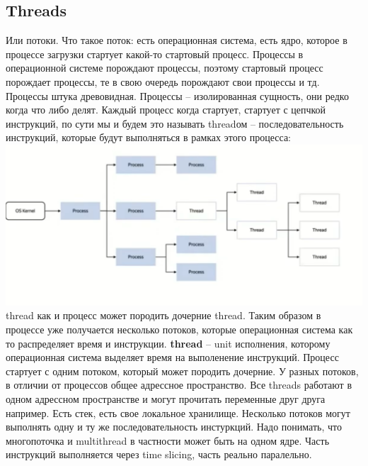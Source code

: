 \documentclass{article}
\begin{document}
    \subsection{Threads}
    Или потоки. Что такое поток: есть операционная система, есть ядро, которое в процессе загрузки стартует какой-то стартовый процесс. Процессы в операционной системе порождают процессы, поэтому стартовый процесс порождает процессы, те в свою очередь порождают свои процессы и тд. Процессы штука древовидная. Процессы -- изолированная сущность, они редко когда что либо делят. 
    \newline
    Каждый процесс когда стартует, стартует с цепчкой инструкций, по сути мы и будем это называть threadом -- последовательность инструкций, которые будут выполняться в рамках этого процесса:
    \newline
    \includegraphics[scale = 0.2]{pic/Снимок экрана 2023-08-03 в 22.19.37.png}
    \newline
    thread как и процесс может породить дочерние thread. Таким образом в процессе уже получается несколько потоков, которые операционная система как то распределяет время и инструкции. 
    \newline
    \textbf{thread} -- unit исполнения, которому операционная система выделяет время на выполенение инструкций. Процесс стартует с одним потоком, который может породить дочерние. У разных потоков, в отличии от процессов общее адрессное пространство. Все threads работают в одном адрессном пространстве и могут прочитать переменные друг друга например. Есть стек, есть свое локальное хранилище. 
    \newline
    Несколько потоков могут выполнять одну и ту же последовательность инстуркций. Надо понимать, что многопоточка и multithread в частности может быть на одном ядре. 
    \newline
    Часть инструкций выполняется через time slicing, часть реально паралельно. 
    \newline
\end{document}
